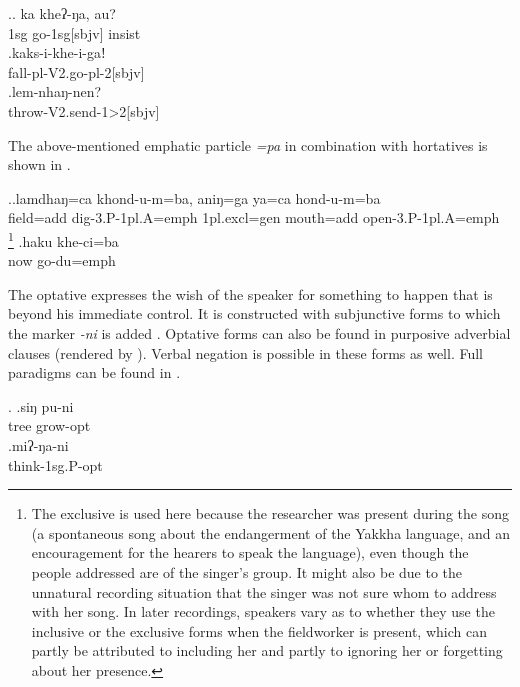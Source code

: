\ex.\ag. ka kheʔ-ŋa, au?\\
  {\sc 1sg} go{\sc -1sg[sbjv]} {\sc insist}\\
  \bg.kaks-i-khe-i-gaǃ\\
  fall{\sc -pl-V2.go-pl-2[sbjv]}\\
  \bg.lem-nhaŋ-nen?\\
  throw{\sc -V2.send-1>2[sbjv]}\\
  
The above-mentioned emphatic particle \emph{=pa} in combination with hortatives is shown in \Next.
  
  \ex.\ag.lamdhaŋ=ca        khond-u-m=ba, aniŋ=ga ya=ca           hond-u-m=ba\\
 field{\sc =add} dig{\sc -3.P-1pl.A=emph} {\sc 1pl.excl=gen} mouth{\sc =add} open{\sc -3.P-1pl.A=emph}\\
 \footnote{The exclusive is used here because the researcher was present during the song (a spontaneous song about the endangerment of the Yakkha language, and an encouragement for the hearers to speak the language), even though the people addressed are of the singer's group. It might also be due to the unnatural recording situation that the singer was not sure whom to address with her song. In later recordings, speakers vary as to whether they use the inclusive or the exclusive forms when the fieldworker is present, which can partly be attributed to including her and partly to ignoring her or forgetting about her presence.}  
  \bg.haku khe-ci=ba\\
  now go{\sc -du=emph}\\
  
  
  The optative expresses the wish of the speaker for something to happen that is beyond his immediate control. It is constructed with subjunctive forms to which the marker \emph{-ni}  is added \Next. Optative forms can also be found in purposive adverbial clauses (rendered by ). Verbal negation is possible in these forms as well. Full paradigms can be found in .
  
  \ex. \ag.siŋ pu-ni\\
  tree grow{\sc [3sg]-opt}\\
  \bg.miʔ-ŋa-ni\\
  think{\sc -1sg.P-opt}\\
 

